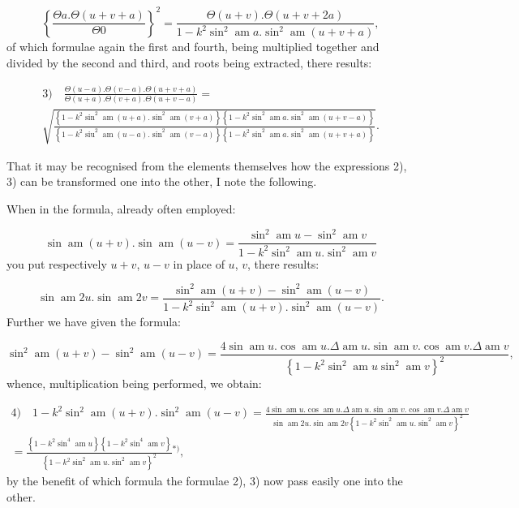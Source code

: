 \documentclass{article}
\begin{document}
\[
\left\{\frac{\Theta a.\Theta(u+v+a)}{\Theta0}\right\}^{2}=\frac{\Theta(u+v).\Theta(u+v+2a)}{1-k^{2}\sin^{2}\operatorname{am}a.\sin^{2}\operatorname{am}(u+v+a)},
\]
of which formulae again the first and fourth, being multiplied together and divided by the second and third, and roots being extracted, there results:

\[
\begin{gathered}
\text{3)}\quad \frac{\Theta(u-a).\Theta(v-a).\Theta(u+v+a)}{\Theta(u+a).\Theta(v+a).\Theta(u+v-a)}=\\[1.5ex]
\sqrt{\frac{\left\{1-k^{2}\sin^{2}\operatorname{am}(u+a).\sin^{2}\operatorname{am}(v+a)\right\}\left\{1-k^{2}\sin^{2}\operatorname{am}a.\sin^{2}\operatorname{am}(u+v-a)\right\}}{\left\{1-k^{2}\operatorname{siu}^{2}\operatorname{am}(u-a).\sin^{2}\operatorname{am}(v-a)\right\}\left\{1-k^{2}\sin^{2}\operatorname{am}a.\sin^{2}\operatorname{am}(u+v+a)\right\}}}.
\end{gathered}
\]

That it may be recognised from the elements themselves how the expressions 2), 3) can be transformed one into the other, I note the following.

When in the formula, already often employed:

\[
\sin\operatorname{am}(u+v).\sin\operatorname{am}(u-v)=\frac{\sin^{2}\operatorname{am}u-\sin^{2}\operatorname{am}v}{1-k^{2}\sin^{2}\operatorname{am}u.\sin^{2}\operatorname{am}v}
\]
you put respectively $u+v$, $u-v$ in place of $u$, $v$, there results:

\[
\sin\operatorname{am}2u.\sin\operatorname{am}2v=\frac{\sin^{2}\operatorname{am}(u+v)-\sin^{2}\operatorname{am}(u-v)}{1-k^{2}\sin^{2}\operatorname{am}(u+v).\sin^{2}\operatorname{am}(u-v)}.
\]
Further we have given the formula:

\[
\sin^{2}\operatorname{am}(u+v)-\sin^{2}\operatorname{am}(u-v)=\frac{4\sin\operatorname{am}u.\cos\operatorname{am}u.\Delta\operatorname{am}u.\sin\operatorname{am}v.\cos\operatorname{am}v.\Delta\operatorname{am}v}{\left\{1-k^{2}\sin^{2}\operatorname{am}u\sin^{2}\operatorname{am}v\right\}^{2}},
\]
whence, multiplication being performed, we obtain:

\[
\begin{gathered}
\text{4)}\quad 1-k^{2}\sin^{2}\operatorname{am}(u+v).\sin^{2}\operatorname{am}(u-v)=\frac{4\sin\operatorname{am}u.\cos\operatorname{am}u.\Delta\operatorname{am}u.\sin\operatorname{am}v.\cos\operatorname{am}v.\Delta\operatorname{am}v}{\sin\operatorname{am}2u.\sin\operatorname{am}2v\left\{1-k^{2}\sin^{2}\operatorname{am}u.\sin^{2}\operatorname{am}v\right\}^{2}}\\[1.5ex]
=\frac{\left\{1-k^{2}\sin^{4}\operatorname{am}u\right\}\left\{1-k^{2}\sin^{4}\operatorname{am}v\right\}}{\left\{1-k^{2}\sin^{2}\operatorname{am}u.\sin^{2}\operatorname{am}v\right\}^{2}}{}^{*)},
\end{gathered}
\]
by the benefit of which formula the formulae 2), 3) now pass easily one into the other.
\end{document}
